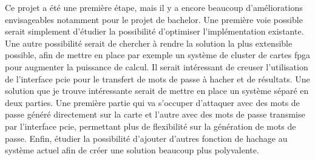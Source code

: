 \newpage


Ce projet a été une première étape, mais il y a encore beaucoup d'améliorations envisageables notamment pour le projet de bachelor.
Une première voie possible serait simplement d'étudier la possibilité d'optimiser l'implémentation existante.
Une autre possibilité serait de chercher à rendre la solution la plus extensible possible, afin de mettre en place par exemple un système de cluster de cartes \gls{fpga} pour augmenter la puissance de calcul.
Il serait intéressant de creuser l'utilisation de l'interface \gls{pcie} pour le transfert de mots de passe à hacher et de résultats.
Une solution que je trouve intéressante serait de mettre en place un système séparé en deux parties. 
Une première partie qui va s'occuper d'attaquer avec des mots de passe généré directement sur la carte et l'autre avec des mots de passe transmise par l'interface \gls{pcie}, permettant plus de flexibilité sur la génération de mots de passe.
Enfin, étudier la possibilité d'ajouter d'autres fonction de hachage au système actuel afin de créer une solution beaucoup plus polyvalente.